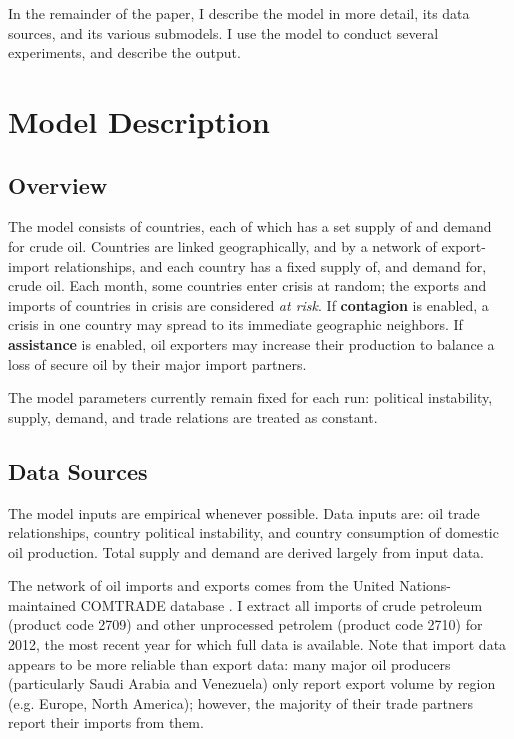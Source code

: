 \documentclass{article}
\begin{document}
In the remainder of the paper, I describe the model in more detail, its data sources, and its various submodels. I use the model to conduct several experiments, and describe the output. 

\section{Model Description}

\subsection{Overview}

The model consists of countries, each of which has a set supply of and demand for crude oil. Countries are linked geographically, and by a network of export-import relationships, and each country has a fixed supply of, and demand for, crude oil. Each month, some countries enter crisis at random; the exports and imports of countries in crisis are considered \emph{at risk}. If \textbf{contagion} is enabled, a crisis in one country may spread to its immediate geographic neighbors. If \textbf{assistance} is enabled, oil exporters may increase their production to balance a loss of secure oil by their major import partners.

The model parameters currently remain fixed for each run: political instability, supply, demand, and trade relations are treated as constant. 

\subsection{Data Sources}
The model inputs are empirical whenever possible. Data inputs are: oil trade relationships, country political instability, and country consumption of domestic oil production. Total supply and demand are derived largely from input data.

The network of oil imports and exports comes from the United Nations-maintained COMTRADE database \citep{un_2013}. I extract all imports of crude petroleum (product code 2709) and other unprocessed petrolem (product code 2710) for 2012, the most recent year for which full data is available. Note that import data appears to be more reliable than export data: many major oil producers (particularly Saudi Arabia and Venezuela) only report export volume by region (e.g. Europe, North America); however, the majority of their trade partners report their imports from them.
\end{document}
